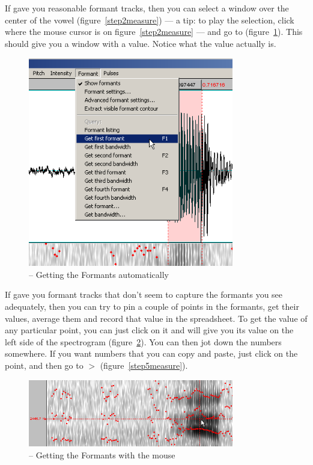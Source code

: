 If \Praat{} gave you reasonable formant tracks, then you can select a window over the center of the vowel (figure~\ref{step2measure}) --- a tip: to play the selection, click where the mouse cursor is on figure~\ref{step2measure} --- and go to  (figure~\ref{step3measure}). This should give you a window with a value. Notice what the value actually is.

\begin{figure}[!tbp]
\caption{\Praat{} -- Getting the Formants automatically}
\label{step3measure}
	\begin{center}
		\includegraphics[width=0.8\textwidth]{./figures/PraatSpectrogrGetF1}
	\end{center}
\end{figure}


If \Praat{} gave you formant tracks that don't seem to capture the formants you see adequately, then you can try to pin a couple of points in the formants, get their values, average them and record that value in the spreadsheet. To get the value of any particular point, you can just click on it and \Praat{} will give you its value on the left side of the spectrogram (figure~\ref{step4measure}). You can then jot down the numbers somewhere. If you want numbers that you can copy and paste, just click on the point, and then go to  $>$  (figure~\ref{step5measure}).

\begin{figure}[!tbp]
\caption{\Praat{} -- Getting the Formants with the mouse}
\label{step4measure}
	\begin{center}
		\includegraphics[width=0.8\textwidth]{./figures/PraatSpectrogrGetF1byCursor}
	\end{center}
\end{figure}

